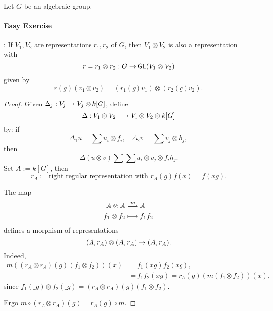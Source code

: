 Let $G$ be an algebraic group.
\paragraph{Easy Exercise}: If $V_1,V_2$ are representations $r_1,r_2$ of $G$, then $V_1\otimes V_2$ is also a representation with
\[ r = r_1 \otimes r_2: G \overset{}{\rightarrow} \textsf{GL}(V_1 \otimes V_2) \]
given by
\[ r(g)(v_1 \otimes v_2) = (r_1(g)v_1) \otimes (r_2(g) v_2).  \]
\begin{proof}
	Given $\Delta_j : V_j \overset{}{\rightarrow} V_j \otimes k[G]$, define
	\[\Delta : V_1\otimes V_2 \overset{}{\longrightarrow} V_1 \otimes V_2 \otimes k[G]\]
	by:
	if
	\[ \Delta_1 u = \sum u_i \otimes f_i, ~~~~ \Delta_2 v = \sum v_j \otimes h_j, \]
	then
	\[ \Delta(u\otimes v) \sum \sum u_i \otimes v_j \otimes f_i h_j. \]
	Set $A := k[G]$, then
	\[ r_A := \text{right regular representation with } r_A(g) f(x) = f(xg). \]
	
	The map
	\begin{align*}
	A \otimes A &\overset{m}{\longrightarrow} A\\
	f_1 \otimes f_2 &\longmapsto f_1f_2
	\end{align*}
	defines a morphism of representations
	\[ (A, r_A) \otimes (A, r_A) \overset{}{\rightarrow} (A, r_A). \]
	Indeed,
	\begin{align*}
	m((r_A \otimes r_A)(g)(f_1 \otimes f_2))(x) &= f_1(xg)f_2(xg),\\
	&= f_1f_2(xg) = r_A(g)(m(f_1 \otimes f_2))(x),
	\end{align*}
	since $f_1(\_ g) \otimes f_2(\_ g) = (r_A \otimes r_A)(g)(f_1 \otimes f_2)$.
	
	Ergo $m \circ (r_A \otimes r_A)(g) = r_A(g) \circ m$.
\end{proof}


